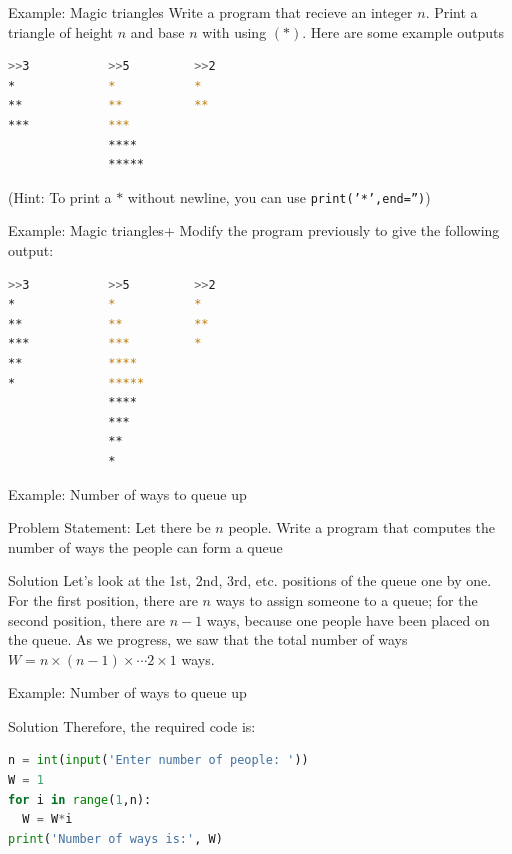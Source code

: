\documentclass[10pt,xcolor={table,dvipsnames},t]{beamer}
\begin{document}
\begin{frame}[fragile]{Example: Magic triangles}
  Write a program that recieve an integer $n$. Print a triangle of height $n$ and base $n$ with using $(*)$. Here are some example outputs
\begin{lstlisting}[language=bash]
>>3           >>5         >>2
*             *           *
**            **          **
***           ***
              ****
              *****
\end{lstlisting}
(Hint: To print a $*$ without newline, you can use \texttt{print('*',end='')})
\end{frame}

\begin{frame}[fragile]{Example: Magic triangles+}
  Modify the program previously to give the following output:
\begin{lstlisting}[language=bash]
>>3           >>5         >>2
*             *           *
**            **          **
***           ***         *
**            ****
*             *****
              ****
              ***
              ** 
              *
\end{lstlisting}
\end{frame}

\begin{frame}[fragile]{Example: Number of ways to queue up}
  \begin{exampleblock}{Problem Statement:}
    Let there be $n$ people. Write a program that computes the number of ways the people can form a queue
  \end{exampleblock}
  \begin{exampleblock}{Solution}
    Let's look at the 1st, 2nd, 3rd, etc. positions of the queue one by one. For the first position, there are $n$ ways to assign someone to a queue; for the second position, there are $n-1$ ways, because one people have been placed on the queue. As we progress, we saw that the total number of ways $W=n\times (n-1)\times \cdots 2 \times 1$ ways.
  \end{exampleblock}
\end{frame}

\begin{frame}[fragile]{Example: Number of ways to queue up}
  \begin{exampleblock}{Solution}
    Therefore, the required code is:
\begin{lstlisting}[language=python]
n = int(input('Enter number of people: '))
W = 1 
for i in range(1,n):
  W = W*i
print('Number of ways is:', W)
\end{lstlisting}
  \end{exampleblock}
\end{frame}
\end{document}
